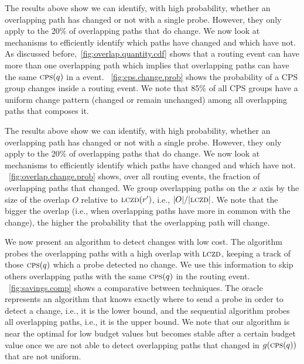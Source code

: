  The results above show we
can identify, with high probability, whether an overlapping path has
changed or not with a single probe.  However, they only apply to the
20\% of overlapping paths that do change.  We now look at mechanisms
to efficiently identify which paths have changed and which have not.
As discussed before,\figstr~\ref{fig:overlap.quantity.cdf}  
shows that a routing event can have more than one overlapping path
which implies that overlapping paths can have the same
$\mathrm{\textsc{cps}}(q)$ in a event. \figstr~\ref{fig:cps.change.prob} shows the probability of 
a CPS group changes inside a routing event. We note that 85\% of all CPS groups 
have a uniform change pattern (changed or remain unchanged) among all overlapping
paths that composes it. 





 The results above show we
can identify, with high probability, whether an overlapping path has
changed or not with a single probe.  However, they only apply to the
20\% of overlapping paths that do change.  We now look at mechanisms
to efficiently identify which paths have changed and which have not.
\figstr~\ref{fig:overlap.change.prob} shows, over all routing
events, the fraction of overlapping paths that changed.  We group
overlapping paths on the $x$ axis by the size of the overlap $O$
relative to $\mathrm{\textsc{lczd}}(r')$, i.e., $|O|/|\mathrm{\textsc{lczd}}|$.  We note that the
bigger the overlap (i.e., when overlapping paths have more in common
with the change), the higher the probability that the overlapping
path will change.  


We now present an algorithm to detect
changes with low cost. The algorithm probes the overlapping paths with
a high overlap with $\mathrm{\textsc{lczd}}$, keeping a track of those $\mathrm{\textsc{cps}}(q)$ which a probe
detected no change. We use this information to skip others overlapping paths 
with the same $\mathrm{\textsc{cps}}(q)$ in the routing event. \figstr~\ref{fig:savings.comp}
shows a comparative between techniques. The oracle represents an algorithm that
knows exactly where to send a probe in order to detect a change, i.e., 
it is the lower bound, and the sequential algorithm probes all overlapping paths,
i.e., it is the upper bound. We note that our algorithm is near the optimal
for low budget values but becomes stable after a certain budget value
once we are not able to detect overlapping paths that changed in $g(\mathrm{\textsc{cps}}(q))$ that 
are not uniform.  

